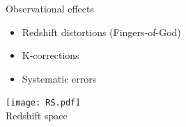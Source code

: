\begin{frame}
\begin{minipage}[c][0.4\textheight][c]{\linewidth}
    \end{minipage}
    \begin{minipage}[c][0.4\textheight][c]{\linewidth}
        \begin{block}{Observational effects}
            \begin{minipage}{0.59\linewidth}
                \begin{itemize}
                    \item<1-> Redshift distortions (Fingers-of-God)
                    \item<4-> K-corrections
                    \item<5-> Systematic errors
                \end{itemize}
            \end{minipage}
            \begin{minipage}{0.39\linewidth}
                \centering
                \texttt{[image: RS.pdf]}\\
                \scriptsize Redshift space
            \end{minipage}
        \end{block}
    \end{minipage}
\end{frame}

